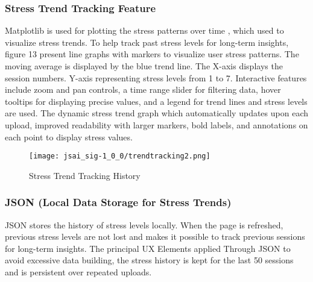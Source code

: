 \documentclass[a4j, twocolumn]{article}
\begin{document}
    \subsubsection{ Stress Trend Tracking Feature}
    Matplotlib is used for plotting the stress patterns over time , which used to visualize stress trends. To help track past stress levels for long-term insights, figure 13 present line graphs with markers to visualize user stress patterns.  The moving average is displayed by the blue trend line. The X-axis displays the session numbers. Y-axis representing stress levels from 1 to 7. Interactive features include zoom and pan controls, a time range slider for filtering data, hover tooltips for displaying precise values, and a legend for trend lines and stress levels are used. The dynamic stress trend graph which automatically updates upon each upload, improved readability with larger markers, bold labels, and annotations on each point to display stress values. 
\vspace{10pt} %
     \begin{figure}[htbp]
    \centering
    \texttt{[image: jsai\_sig-1\_0\_0/trendtracking2.png]}
    \caption{Stress Trend Tracking History}
    \label{fig:enhanced_trend_tracking}
\end{figure}
    \subsubsection{ JSON (Local Data Storage for Stress Trends)}
     JSON stores the history of stress levels locally. When the page is refreshed, previous stress levels are not lost and makes it possible to track previous sessions for long-term insights. The principal UX Elements applied Through JSON to avoid excessive data building, the stress history is kept for the last 50 sessions and is persistent over repeated uploads.
\end{document}
